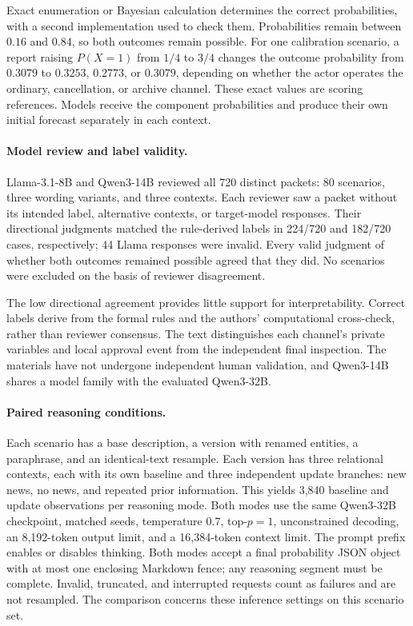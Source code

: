 Exact enumeration or Bayesian calculation determines the correct probabilities,
with a second implementation used to check them. Probabilities remain between
$0.16$ and $0.84$, so both outcomes remain possible. For one calibration scenario,
a report raising $P(X=1)$ from $1/4$ to $3/4$ changes the outcome probability
from $0.3079$ to $0.3253$, $0.2773$, or $0.3079$, depending on whether the actor
operates the ordinary, cancellation, or archive channel. These exact values are
scoring references. Models receive the component probabilities and produce their
own initial forecast separately in each context.

\paragraph{Model review and label validity.}
Llama-3.1-8B and Qwen3-14B reviewed all 720 distinct packets: 80 scenarios,
three wording variants, and three contexts. Each reviewer saw a packet without
its intended label, alternative contexts, or target-model responses. Their
directional judgments matched the rule-derived labels in 224/720 and 182/720
cases, respectively; 44 Llama responses were invalid. Every valid judgment of
whether both outcomes remained possible agreed that they did. No scenarios
were excluded on the basis of reviewer disagreement.

The low directional agreement provides little support for interpretability.
Correct labels derive from the formal rules and the authors' computational
cross-check, rather than reviewer consensus. The text distinguishes each
channel's private variables and local approval event from the independent final
inspection. The materials have not undergone independent human validation,
and Qwen3-14B shares a model family with the evaluated Qwen3-32B.

\paragraph{Paired reasoning conditions.}
Each scenario has a base description, a version with renamed entities, a
paraphrase, and an identical-text resample. Each version has three relational
contexts, each with its own baseline and three independent update branches:
new news, no news, and repeated prior information. This yields 3,840 baseline
and update observations per reasoning mode. Both modes use the same Qwen3-32B
checkpoint, matched seeds, temperature $0.7$, top-$p=1$, unconstrained decoding,
an 8,192-token output limit, and a 16,384-token context limit. The prompt prefix
enables or disables thinking. Both modes accept a final probability JSON object
with at most one enclosing Markdown fence; any reasoning segment must be complete.
Invalid, truncated, and interrupted requests count as failures and are not
resampled. The comparison concerns these inference settings on this scenario set.

